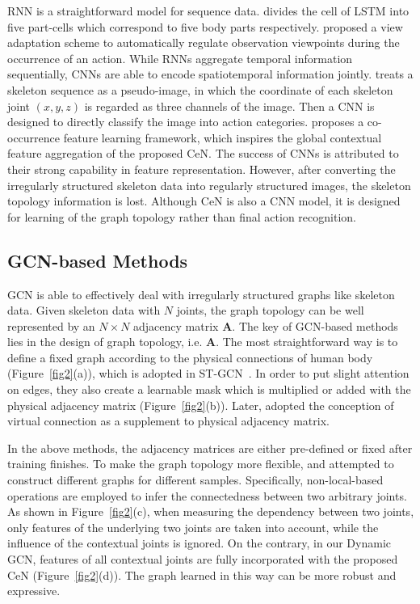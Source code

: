 \documentclass[sigconf]{acmart}
\begin{document}
RNN is a straightforward model for sequence data. \cite{shahroudy} divides the cell of LSTM into five part-cells which correspond to five body parts respectively. \cite{zhang2017view} proposed a view adaptation scheme to automatically regulate observation viewpoints during the occurrence of an action. While RNNs aggregate temporal information sequentially, CNNs are able to encode spatiotemporal information jointly. \cite{li2017skeleton} treats a skeleton sequence as a pseudo-image, in which the coordinate of each skeleton joint $(x, y, z)$ is regarded as three channels of the image. Then a CNN is designed to directly classify the image into action categories. \cite{lili} proposes a co-occurrence feature learning framework, which inspires the global contextual feature aggregation of the proposed CeN. The success of CNNs is attributed to their strong capability in feature representation. However, after converting the irregularly structured skeleton data into regularly structured images, the skeleton topology information is lost. Although CeN is also a CNN model, it is designed for learning of the graph topology rather than final action recognition.

\subsection{GCN-based Methods}
GCN is able to effectively deal with irregularly structured graphs like skeleton data. Given skeleton data with $N$ joints, the graph topology can be well represented by an $N \times N$ adjacency matrix $\mathbf{A}$. The key of GCN-based methods lies in the design of graph topology, i.e. $\mathbf{A}$. The most straightforward way is to define a fixed graph according to the physical connections of human body (Figure~\ref{fig2}(a)), which is adopted in ST-GCN~\cite{yanspatial}. In order to put slight attention on edges, they also create a learnable mask which is multiplied or added with the physical adjacency matrix (Figure~\ref{fig2}(b)). Later, \cite{tang2018deep} adopted the conception of virtual connection as a supplement to physical adjacency matrix.

In the above methods, the adjacency matrices are either pre-defined or fixed after training finishes. To make the graph topology more flexible, \cite{shi2019two,liu2020} and \cite{li2019spatio} attempted to construct different graphs for different samples. Specifically, non-local-based operations are employed to infer the connectedness between two arbitrary joints. As shown in Figure~\ref{fig2}(c), when measuring the dependency between two joints, only features of the underlying two joints are taken into account, while the influence of the contextual joints is ignored. On the contrary, in our Dynamic GCN, features of all contextual joints are fully incorporated with the proposed CeN (Figure~\ref{fig2}(d)). The graph learned in this way can be more robust and expressive.
\end{document}
